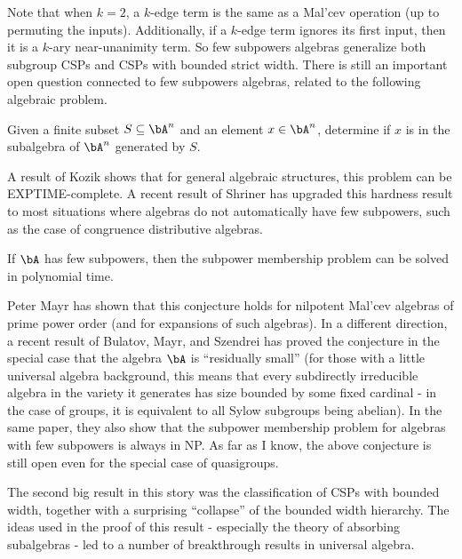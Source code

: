Note that when $k = 2$, a $k$-edge term is the same as a Mal'cev operation (up to permuting the inputs). Additionally, if a $k$-edge term ignores its first input, then it is a $k$-ary near-unanimity term. So few subpowers algebras generalize both subgroup CSPs and CSPs with bounded strict width. There is still an important open question connected to few subpowers algebras, related to the following algebraic problem.

\begin{prob} Given a finite subset $S \subseteq \bA^n$ and an element $x \in \bA^n$, determine if $x$ is in the subalgebra of $\bA^n$ generated by $S$.
\end{prob}

A result of Kozik \cite{kozik-subpower-exptime} shows that for general algebraic structures, this problem can be EXPTIME-complete. A recent result of Shriner \cite{subpower-hardness} has upgraded this hardness result to most situations where algebras do not automatically have few subpowers, such as the case of congruence distributive algebras.

\begin{conj} If $\bA$ has few subpowers, then the subpower membership problem can be solved in polynomial time.
\end{conj}

Peter Mayr \cite{subpower-supernilpotent} has shown that this conjecture holds for nilpotent Mal'cev algebras of prime power order (and for expansions of such algebras). In a different direction, a recent result of Bulatov, Mayr, and Szendrei \cite{subpower-residually-small} has proved the conjecture in the special case that the algebra $\bA$ is ``residually small'' (for those with a little universal algebra background, this means that every subdirectly irreducible algebra in the variety it generates has size bounded by some fixed cardinal - in the case of groups, it is equivalent to all Sylow subgroups being abelian). In the same paper, they also show that the subpower membership problem for algebras with few subpowers is always in NP. As far as I know, the above conjecture is still open even for the special case of quasigroups.

The second big result in this story was the classification of CSPs with bounded width, together with a surprising ``collapse'' of the bounded width hierarchy. The ideas used in the proof of this result - especially the theory of absorbing subalgebras - led to a number of breakthrough results in universal algebra.

